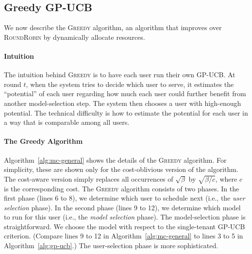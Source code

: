 \documentclass[letterpaper]{vldb}
\newcommand{\rr}{\textsc{RoundRobin}\xspace}
\newcommand{\greedy}{\textsc{Greedy}\xspace}
\begin{document}
\subsection{Greedy GP-UCB}

We now describe the \greedy algorithm, an 
algorithm that improves over \rr by 
dynamically allocate resources.

\vspace{-0.5em}
\paragraph*{Intuition}
The intuition behind \greedy is to have
each user run their own GP-UCB. At round
$t$, when the system tries to decide which
user to serve, it estimates the
``potential'' of each user regarding how much each
user could further benefit from another
model-selection step. The system then
chooses a user with high-enough potential.
The technical difficulty is how to
estimate the potential for each user 
in a way that is comparable among all users.

\vspace{-0.5em}
\paragraph*{The Greedy Algorithm}

Algorithm~\ref{alg:mc-general} shows the details 
of the \greedy algorithm. For simplicity,
these are shown only for the cost-oblivious version of the algorithm. The cost-aware version simply replaces all occurrences of $\sqrt{\beta}$ by $\sqrt{\beta/c}$, where $c$ is the corresponding cost.
The \greedy algorithm consists of two phases.
In the first phase (lines 6 to 8), we determine which user to schedule next (i.e., the \emph{user selection} phase).
In the second phase (lines 9 to 12), we determine which model to run for this user (i.e., the \emph{model selection} phase).
The model-selection phase is straightforward. We choose the model with respect to the single-tenant GP-UCB criterion. (Compare lines 9 to 12 in Algorithm~\ref{alg:mc-general} to lines 3 to 5 in Algorithm~\ref{alg:gp-ucb}.)
The user-selection phase is more sophisticated.
\end{document}
